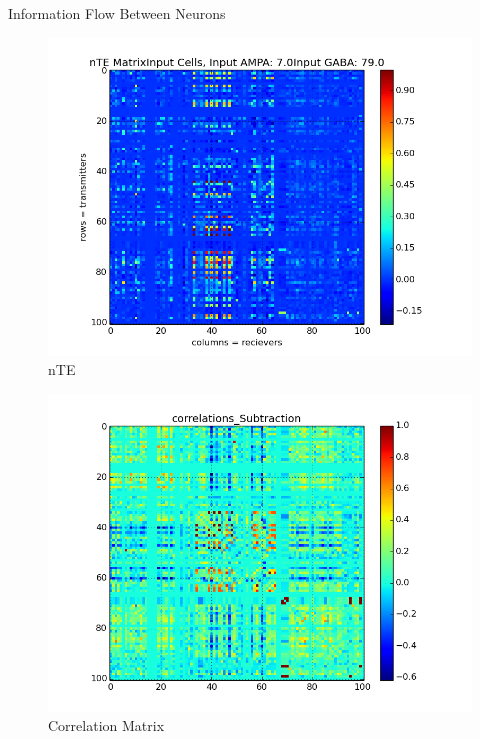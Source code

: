\documentclass{beamer}
\begin{document}
\begin{frame}{Information Flow Between Neurons}
\begin{itemize}
\begin{figure}
\begin{minipage}{0.45\linewidth}
\centering
\includegraphics[scale=0.301]{nTE_matrix_imshow0_0500_0125010_010012_010_0.png}
\vfill nTE

\end{minipage}
\begin{minipage}{0.45\linewidth}
\centering
\includegraphics[scale=0.301]{correlations0_0500_012501_00_010013_010_0.png}
\vfill Correlation Matrix

\end{minipage}
\end{figure}



\end{itemize}
\end{frame}
\end{document}
